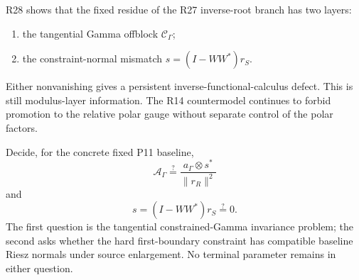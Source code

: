 \begin{remark}[R28 firewall]
\label{rem:o3aa-firewall}
R28 shows that the fixed residue of the R27 inverse-root branch has two layers:
\begin{enumerate}
 \item the tangential Gamma offblock $\mathscr C_\Gamma$;
 \item the constraint-normal mismatch $s=(I-WW^*)r_S$.
\end{enumerate}
Either nonvanishing gives a persistent inverse-functional-calculus defect.  This is
still modulus-layer information.  The R14 countermodel continues to forbid promotion
to the relative polar gauge without separate control of the polar factors.
\end{remark}

\begin{openproblem}
\label{open:o3aa-fixed-tests}
Decide, for the concrete fixed P11 baseline,
\[
 \boxed{
 \mathcal A_\Gamma
 \stackrel{?}{=}
 \frac{a_\Gamma\otimes s^*}{\|r_R\|^2}
 }
\]
and
\[
 \boxed{s=(I-WW^*)r_S\stackrel{?}{=}0.}
\]
The first question is the tangential constrained-Gamma invariance problem; the second
asks whether the hard first-boundary constraint has compatible baseline Riesz normals
under source enlargement.  No terminal parameter remains in either question.
\end{openproblem}
